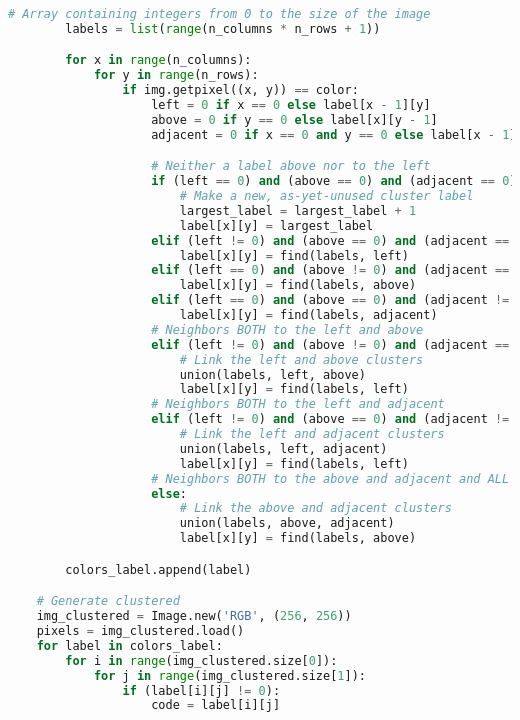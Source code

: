 \documentclass{article}
\begin{document}
\begin{lstlisting}[language=Python]
        # Array containing integers from 0 to the size of the image
        labels = list(range(n_columns * n_rows + 1))

        for x in range(n_columns):
            for y in range(n_rows):
                if img.getpixel((x, y)) == color:
                    left = 0 if x == 0 else label[x - 1][y]
                    above = 0 if y == 0 else label[x][y - 1]
                    adjacent = 0 if x == 0 and y == 0 else label[x - 1][y - 1]

                    # Neither a label above nor to the left
                    if (left == 0) and (above == 0) and (adjacent == 0):
                        # Make a new, as-yet-unused cluster label
                        largest_label = largest_label + 1
                        label[x][y] = largest_label
                    elif (left != 0) and (above == 0) and (adjacent == 0):  # One neighbor, to the left
                        label[x][y] = find(labels, left)
                    elif (left == 0) and (above != 0) and (adjacent == 0):  # One neighbor, above
                        label[x][y] = find(labels, above)
                    elif (left == 0) and (above == 0) and (adjacent != 0):  # One neighbor, adjacent
                        label[x][y] = find(labels, adjacent)
                    # Neighbors BOTH to the left and above
                    elif (left != 0) and (above != 0) and (adjacent == 0):
                        # Link the left and above clusters
                        union(labels, left, above)
                        label[x][y] = find(labels, left)
                    # Neighbors BOTH to the left and adjacent
                    elif (left != 0) and (above == 0) and (adjacent != 0):
                        # Link the left and adjacent clusters
                        union(labels, left, adjacent)
                        label[x][y] = find(labels, left)
                    # Neighbors BOTH to the above and adjacent and ALL of them
                    else:
                        # Link the above and adjacent clusters
                        union(labels, above, adjacent)
                        label[x][y] = find(labels, above)

        colors_label.append(label)

    # Generate clustered
    img_clustered = Image.new('RGB', (256, 256))
    pixels = img_clustered.load()
    for label in colors_label:
        for i in range(img_clustered.size[0]):
            for j in range(img_clustered.size[1]):
                if (label[i][j] != 0):
                    code = label[i][j]


\end{lstlisting}
\end{document}
